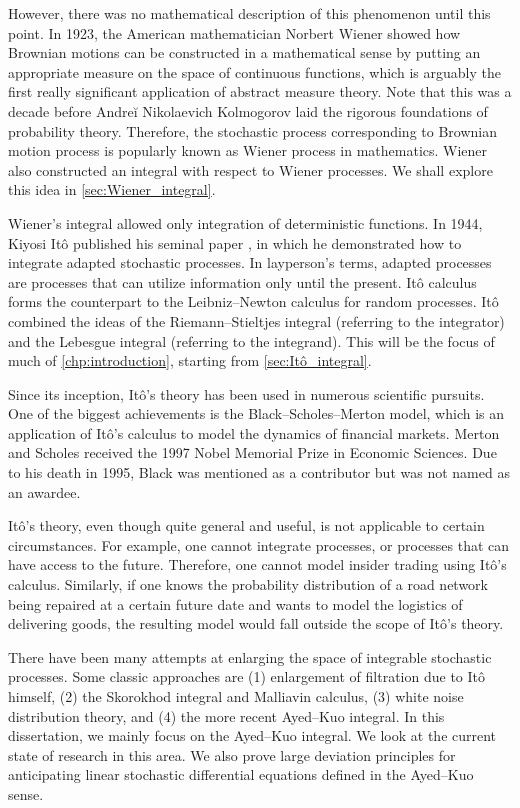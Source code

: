 However, there was no mathematical description of this phenomenon until this point. In 1923, the American mathematician Norbert Wiener showed how Brownian motions can be constructed in a mathematical sense by putting an appropriate measure on the space of continuous functions\cite{Wiener1923}, which is arguably the first really significant application of abstract measure theory. Note that this was a decade before Andreĭ Nikolaevich Kolmogorov laid the rigorous foundations of probability theory\cite{Kolmogorov1933}. Therefore, the stochastic process corresponding to Brownian motion process is popularly known as Wiener process in mathematics. Wiener also constructed an integral with respect to Wiener processes. We shall explore this idea in \cref{sec:Wiener_integral}.

Wiener's integral allowed only integration of deterministic functions. In 1944, Kiyosi Itô published his seminal paper \cite{Itô1944SI}, in which he demonstrated how to integrate adapted stochastic processes. In layperson's terms, adapted processes are processes that can utilize information only until the present. Itô calculus forms the counterpart to the Leibniz–Newton calculus for random processes. Itô combined the ideas of the Riemann–Stieltjes integral (referring to the integrator) and the Lebesgue integral (referring to the integrand). This will be the focus of much of \cref{chp:introduction}, starting from \cref{sec:Itô_integral}.

Since its inception, Itô's theory has been used in numerous scientific pursuits. One of the biggest achievements is the Black–Scholes–Merton model\cite{BS1973,Merton1974}, which is an application of Itô's calculus to model the dynamics of financial markets. Merton and Scholes received the 1997 Nobel Memorial Prize in Economic Sciences. Due to his death in 1995, Black was mentioned as a contributor but was not named as an awardee.

Itô's theory, even though quite general and useful, is not applicable to certain circumstances. For example, one cannot integrate  processes, or processes that can have access to the future. Therefore, one cannot model insider trading using Itô's calculus. Similarly, if one knows the probability distribution of a road network being repaired at a certain future date and wants to model the logistics of delivering goods, the resulting model would fall outside the scope of Itô's theory.

There have been many attempts at enlarging the space of integrable stochastic processes. Some classic approaches are (1) enlargement of filtration due to Itô himself, (2) the Skorokhod integral and Malliavin calculus, (3) white noise distribution theory, and (4) the more recent Ayed–Kuo integral. In this dissertation, we mainly focus on the Ayed–Kuo integral. We look at the current state of research in this area. We also prove large deviation principles for anticipating linear stochastic differential equations defined in the Ayed–Kuo sense.

